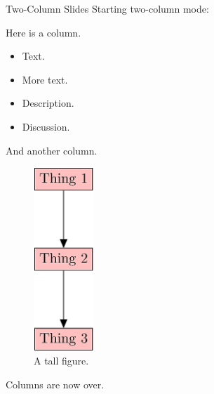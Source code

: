 \documentclass[10pt,ignorenonframetext,]{beamer}
\providecommand{\tightlist}{%
  \setlength{\itemsep}{0pt}\setlength{\parskip}{0pt}}
\begin{document}
\begin{frame}{Two-Column Slides}
\protect\hypertarget{two-column-slides}{}
Starting two-column mode:

Here is a column.

\begin{itemize}[<+->]
\tightlist
\item
  Text.
\item
  More text.
\item
  Description.
\item
  Discussion.
\end{itemize}

And another column.

\begin{figure}
\centering
\includegraphics[width=0.2\textwidth,height=\textheight]{figures/tall_figure.png}
\caption{A tall figure.}
\end{figure}

Columns are now over.
\end{frame}
\end{document}
